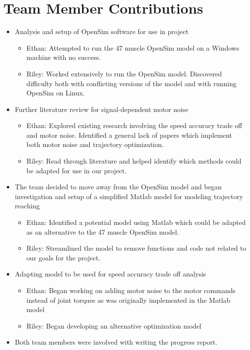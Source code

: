 \documentclass[table,12pt]{article}
\begin{document}
\section{Team Member Contributions}
\begin{itemize}
    \item Analysis and setup of OpenSim software for use in project
        \begin{itemize}
        \item Ethan: Attempted to run the 47 muscle OpenSim model on a Windows machine with no success.
        \item Riley: Worked extensively to run the OpenSim model. Discovered difficulty both with conflicting versions of the model and with running OpenSim on Linux.
    \end{itemize}
    \item Further literature review for signal-dependent motor noise
    \begin{itemize}
        \item Ethan: Explored existing research involving the speed accuracy trade off and motor noise. Identified a general lack of papers which implement both motor noise and trajectory optimization.
        \item Riley: Read through literature and helped identify which methods could be adapted for use in our project.
    \end{itemize}
    \item The team decided to move away from the OpenSim model and began investigation and setup of a simplified Matlab model for modeling trajectory reaching
    \begin{itemize}
        \item Ethan: Identified a potential model using Matlab which could be adapted as an alternative to the 47 muscle OpenSim model.
        \item Riley: Streamlined the model to remove functions and code not related to our goals for the project.
    \end{itemize}
    \item Adapting model to be used for speed accuracy trade off analysis
    \begin{itemize}
        \item Ethan: Began working on adding motor noise to the motor commands instead of joint torques as was originally implemented in the Matlab model
        \item Riley: Began developing an alternative optimization model 
    \end{itemize}
    \item Both team members were involved with writing the progress report.
    
\end{itemize}
\end{document}
